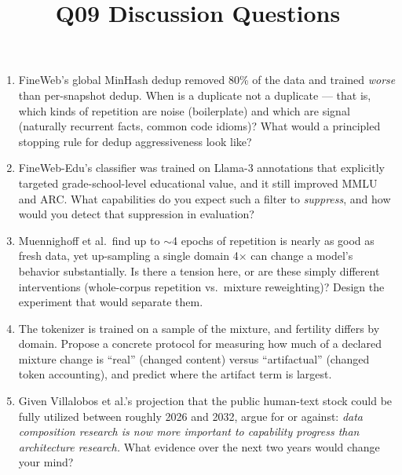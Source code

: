 \documentclass[11pt]{article}
\title{Q09 Discussion Questions}
\date{}
\begin{document}
\maketitle
\begin{enumerate}[noitemsep]
\item FineWeb's global MinHash dedup removed 80\% of the data and trained \emph{worse} than per-snapshot dedup. When is a duplicate not a duplicate --- that is, which kinds of repetition are noise (boilerplate) and which are signal (naturally recurrent facts, common code idioms)? What would a principled stopping rule for dedup aggressiveness look like?
\item FineWeb-Edu's classifier was trained on Llama-3 annotations that explicitly targeted grade-school-level educational value, and it still improved MMLU and ARC. What capabilities do you expect such a filter to \emph{suppress}, and how would you detect that suppression in evaluation?
\item Muennighoff et al.\ find up to $\sim$4 epochs of repetition is nearly as good as fresh data, yet up-sampling a single domain 4$\times$ can change a model's behavior substantially. Is there a tension here, or are these simply different interventions (whole-corpus repetition vs.\ mixture reweighting)? Design the experiment that would separate them.
\item The tokenizer is trained on a sample of the mixture, and fertility differs by domain. Propose a concrete protocol for measuring how much of a declared mixture change is ``real'' (changed content) versus ``artifactual'' (changed token accounting), and predict where the artifact term is largest.
\item Given Villalobos et al.'s projection that the public human-text stock could be fully utilized between roughly 2026 and 2032, argue for or against: \emph{data composition research is now more important to capability progress than architecture research.} What evidence over the next two years would change your mind?
\end{enumerate}
\end{document}
